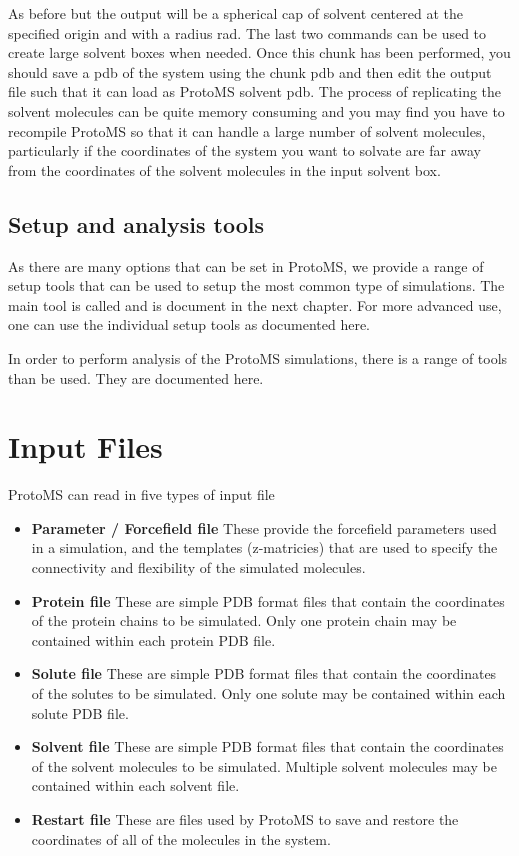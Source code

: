 \documentclass[letterpaper,10pt,english]{sphinxmanual}
\begin{document}
As before but the output will be a spherical cap of solvent centered at the specified origin and with a radius rad. The last two commands can be used to create large solvent boxes when needed. Once this chunk has been performed, you should save a pdb of the system using the chunk pdb and then edit the output file such that it can load as ProtoMS solvent pdb. The process of replicating the solvent molecules can be quite memory consuming and you may find you have to recompile ProtoMS so that it can handle a large number of solvent molecules, particularly if the coordinates of the system you want to solvate are far away from the coordinates of the solvent molecules in the input solvent box.


\section{Setup and analysis tools}
\label{protoms:setup-and-analysis-tools}
As there are many options that can be set in ProtoMS, we provide a range of setup tools that can be used to setup the most common type of simulations. The main tool is called  and is document in the next chapter. For more advanced use, one can use the individual setup tools as documented here.

In order to perform analysis of the ProtoMS simulations, there is a range of tools than be used. They are documented here.


\chapter{Input Files}
\label{protoms:input-files}
ProtoMS can read in five types of input file
\begin{itemize}
\item {} 
\textbf{Parameter / Forcefield file} These provide the forcefield parameters used in a simulation, and the templates (z-matricies) that are used to specify the connectivity and flexibility of the simulated molecules.

\item {} 
\textbf{Protein file} These are simple PDB format files that contain the coordinates of the protein chains to be simulated. Only one protein chain may be contained within each protein PDB file.

\item {} 
\textbf{Solute file} These are simple PDB format files that contain the coordinates of the solutes to be simulated. Only one solute may be contained within each solute PDB file.

\item {} 
\textbf{Solvent file} These are simple PDB format files that contain the coordinates of the solvent molecules to be simulated. Multiple solvent molecules may be contained within each solvent file.

\item {} 
\textbf{Restart file} These are files used by ProtoMS to save and restore the coordinates of all of the molecules in the system.

\end{itemize}
\end{document}
